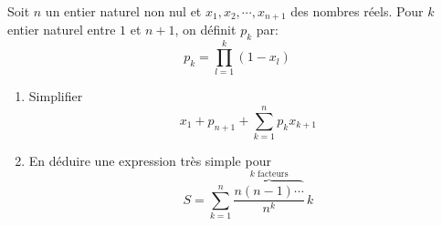 Soit $n$ un entier naturel non nul et $x_1,x_2,\cdots,x_{n+1}$ des nombres réels. Pour $k$ entier naturel entre $1$ et $n+1$, on définit $p_k$ par:
\begin{displaymath}
  p_k = \prod_{l=1}^{k}(1-x_l)
\end{displaymath}
\begin{enumerate}
  \item Simplifier
\begin{displaymath}
  x_1 + p_{n+1} + \sum_{k=1}^{n}p_k x_{k+1}
\end{displaymath}
 \item En déduire une expression très simple pour
\begin{displaymath}
 S = \sum_{k=1}^{n}\frac{\overset{k \text{ facteurs}}{\overbrace{n(n-1)\cdots}}}{n^k}\,k
\end{displaymath}
 
\end{enumerate}
